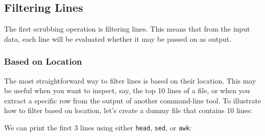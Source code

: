 \documentclass[
]{book}
\newenvironment{Shaded}{\begin{snugshade}}{\end{snugshade}}
\newcommand{\ExtensionTok}[1]{#1}
\newcommand{\FunctionTok}[1]{\textcolor[rgb]{0.00,0.00,0.00}{#1}}
\newcommand{\KeywordTok}[1]{\textcolor[rgb]{0.13,0.29,0.53}{\textbf{#1}}}
\newcommand{\NormalTok}[1]{#1}
\newcommand{\OperatorTok}[1]{\textcolor[rgb]{0.81,0.36,0.00}{\textbf{#1}}}
\newcommand{\StringTok}[1]{\textcolor[rgb]{0.31,0.60,0.02}{#1}}
\theoremstyle{definition}
\theoremstyle{definition}
\theoremstyle{definition}
\theoremstyle{remark}
\begin{document}
\hypertarget{filtering-lines}{%
\subsection{Filtering Lines}\label{filtering-lines}}

The first scrubbing operation is filtering lines. This means that from the input data, each line will be evaluated whether it may be passed on as output.

\hypertarget{based-on-location}{%
\subsubsection{Based on Location}\label{based-on-location}}

The most straightforward way to filter lines is based on their location. This may be useful when you want to inspect, say, the top 10 lines of a file, or when you extract a specific row from the output of another command-line tool. To illustrate how to filter based on location, let's create a dummy file that contains 10 lines:

\begin{Shaded}
\end{Shaded}

We can print the first 3 lines using either \texttt{head}, \texttt{sed}, or \texttt{awk}:

\begin{Shaded}
\end{Shaded}
\end{document}

